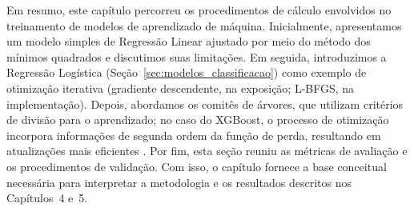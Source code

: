 Em resumo, este capítulo percorreu os procedimentos de cálculo envolvidos no treinamento de modelos de aprendizado de máquina. Inicialmente, apresentamos um modelo simples de Regressão Linear ajustado por meio do método dos mínimos quadrados e discutimos suas limitações. Em seguida, introduzimos a Regressão Logística (Seção~\ref{sec:modelos_classificacao}) como exemplo de otimização iterativa (gradiente descendente, na exposição; L-BFGS, na implementação). Depois, abordamos os comitês de árvores, que utilizam critérios de divisão para o aprendizado; no caso do XGBoost, o processo de otimização incorpora informações de segunda ordem da função de perda, resultando em atualizações mais eficientes \citep{geron2019maos}. Por fim, esta seção reuniu as métricas de avaliação e os procedimentos de validação. Com isso, o capítulo fornece a base conceitual necessária para interpretar a metodologia e os resultados descritos nos Capítulos~4 e~5.
